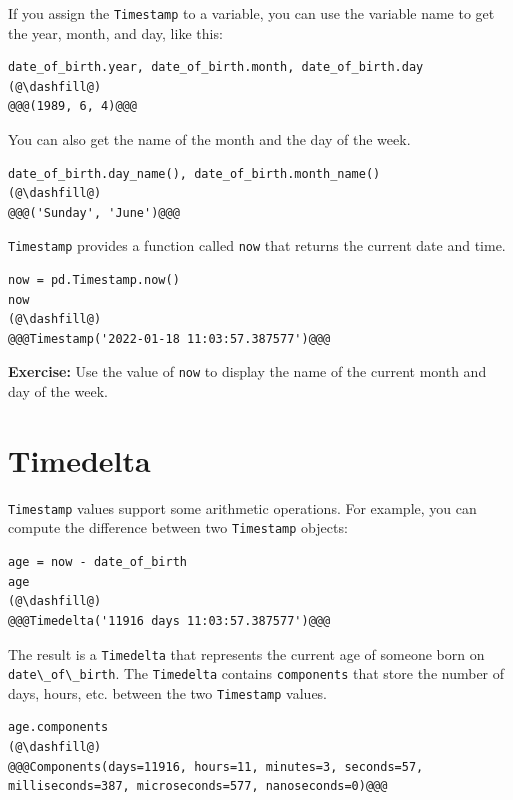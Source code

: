 If you assign the \passthrough{\lstinline!Timestamp!} to a variable, you
can use the variable name to get the year, month, and day, like this:

\begin{lstlisting}[]
date_of_birth.year, date_of_birth.month, date_of_birth.day
(@\dashfill@)
@@@(1989, 6, 4)@@@
\end{lstlisting}

You can also get the name of the month and the day of the week.

\begin{lstlisting}[]
date_of_birth.day_name(), date_of_birth.month_name()
(@\dashfill@)
@@@('Sunday', 'June')@@@
\end{lstlisting}

\passthrough{\lstinline!Timestamp!} provides a function called
\passthrough{\lstinline!now!} that returns the current date and time.

\begin{lstlisting}[]
now = pd.Timestamp.now()
now
(@\dashfill@)
@@@Timestamp('2022-01-18 11:03:57.387577')@@@
\end{lstlisting}

\textbf{Exercise:} Use the value of \passthrough{\lstinline!now!} to
display the name of the current month and day of the week.

\hypertarget{timedelta}{%
\section{Timedelta}\label{timedelta}}

\passthrough{\lstinline!Timestamp!} values support some arithmetic
operations. For example, you can compute the difference between two
\passthrough{\lstinline!Timestamp!} objects:

\begin{lstlisting}[]
age = now - date_of_birth
age
(@\dashfill@)
@@@Timedelta('11916 days 11:03:57.387577')@@@
\end{lstlisting}

The result is a \passthrough{\lstinline!Timedelta!} that represents the
current age of someone born on
\passthrough{\lstinline!date\_of\_birth!}. The
\passthrough{\lstinline!Timedelta!} contains
\passthrough{\lstinline!components!} that store the number of days,
hours, etc. between the two \passthrough{\lstinline!Timestamp!} values.

\begin{lstlisting}[]
age.components
(@\dashfill@)
@@@Components(days=11916, hours=11, minutes=3, seconds=57, milliseconds=387, microseconds=577, nanoseconds=0)@@@
\end{lstlisting}

